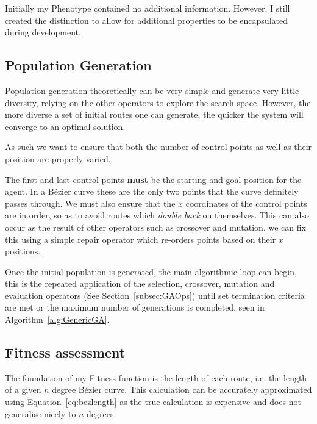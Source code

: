 Initially my Phenotype contained no additional information. However, I still created the distinction to allow for additional properties to be encapsulated during development.

\subsection{Population Generation}

Population generation theoretically can be very simple and generate very little diversity, relying on the other operators to explore the search space. However, the more diverse a set of initial routes one can generate, the quicker the system will converge to an optimal solution.

As such we want to ensure that both the number of control points as well as their position are properly varied.

The first and last control points \textbf{must} be the starting and goal position for the agent. In a Bézier curve these are the only two points that the curve definitely passes through. We must also ensure that the $x$ coordinates of the control points are in order, so as to avoid routes which \textit{double back} on themselves. This can also occur as the result of other operators such as crossover and mutation, we can fix this using a simple repair operator which re-orders points based on their $x$ positions.

Once the initial population is generated, the main algorithmic loop can begin, this is the repeated application of the selection, crossover, mutation and evaluation operators (See Section~\ref{subsec:GAOps}) until set termination criteria are met or the maximum number of generations is completed, seen in Algorithm~\ref{alg:GenericGA}.

\subsection{Fitness assessment}



The foundation of my Fitness function is the length of each route, i.e. the length of a given $n$ degree Bézier curve. This calculation can be accurately approximated using Equation~\ref{eq:bezlength} as the true calculation is expensive and does not generalise nicely to $n$ degrees\cite{gravesenAdaptiveSubdivisionLength1997}.


